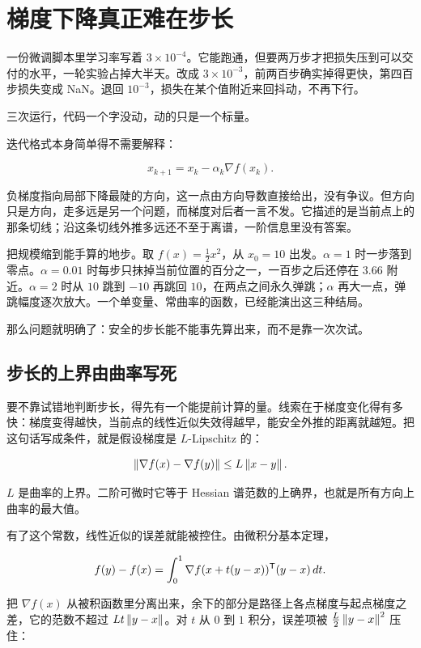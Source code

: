\section{梯度下降真正难在步长}
\label{sec:09-Convex-Optimization/06-Optimization-Algorithms/01}

一份微调脚本里学习率写着 \(3\times10^{-4}\)。它能跑通，但要两万步才把损失压到可以交付的水平，一轮实验占掉大半天。改成 \(3\times10^{-3}\)，前两百步确实掉得更快，第四百步损失变成 NaN。退回 \(10^{-3}\)，损失在某个值附近来回抖动，不再下行。

三次运行，代码一个字没动，动的只是一个标量。

迭代格式本身简单得不需要解释：

\[
x_{k+1}=x_k-\alpha_k\nabla f(x_k).
\]

负梯度指向局部下降最陡的方向，这一点由方向导数直接给出，没有争议。但方向只是方向，走多远是另一个问题，而梯度对后者一言不发。它描述的是当前点上的那条切线；沿这条切线外推多远还不至于离谱，一阶信息里没有答案。

把规模缩到能手算的地步。取 \(f(x)=\frac{1}{2}x^2\)，从 \(x_0=10\) 出发。\(\alpha=1\) 时一步落到零点。\(\alpha=0.01\) 时每步只抹掉当前位置的百分之一，一百步之后还停在 \(3.66\) 附近。\(\alpha=2\) 时从 \(10\) 跳到 \(-10\) 再跳回 \(10\)，在两点之间永久弹跳；\(\alpha\) 再大一点，弹跳幅度逐次放大。一个单变量、常曲率的函数，已经能演出这三种结局。

那么问题就明确了：安全的步长能不能事先算出来，而不是靠一次次试。

\subsection{步长的上界由曲率写死}

要不靠试错地判断步长，得先有一个能提前计算的量。线索在于梯度变化得有多快：梯度变得越快，当前点的线性近似失效得越早，能安全外推的距离就越短。把这句话写成条件，就是假设梯度是 \(L\)-Lipschitz 的：

\[
\left\lVert\nabla f(x)-\nabla f(y)\right\rVert\le L\left\lVert x-y\right\rVert.
\]

\(L\) 是曲率的上界。二阶可微时它等于 Hessian 谱范数的上确界，也就是所有方向上曲率的最大值。

有了这个常数，线性近似的误差就能被控住。由微积分基本定理，

\[
f(y)-f(x)=\int_0^1\nabla f(x+t(y-x))^{\mathsf{T}}(y-x)\,dt .
\]

把 \(\nabla f(x)\) 从被积函数里分离出来，余下的部分是路径上各点梯度与起点梯度之差，它的范数不超过 \(Lt\left\lVert y-x\right\rVert\)。对 \(t\) 从 \(0\) 到 \(1\) 积分，误差项被 \(\frac{L}{2}\left\lVert y-x\right\rVert^2\) 压住：

